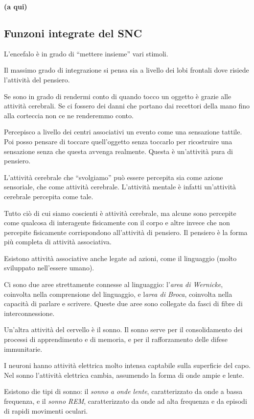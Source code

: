 \documentclass[]{article}
\begin{document}
\textbf{(a qui)}

\subsection{Funzoni integrate del SNC}\label{funzoni-integrate-del-snc}

L'encefalo è in grado di ``mettere insieme'' vari stimoli.

Il massimo grado di integrazione si pensa sia a livello dei lobi
frontali dove risiede l'attività del pensiero.

Se sono in grado di rendermi conto di quando tocco un oggetto è grazie
alle attività cerebrali. Se ci fossero dei danni che portano dai
recettori della mano fino alla corteccia non ce ne renderemmo conto.

Percepisco a livello dei centri associativi un evento come una
sensazione tattile. Poi posso pensare di toccare quell'oggetto senza
toccarlo per ricostruire una sensazione senza che questa avvenga
realmente. Questa è un'attività pura di pensiero.

L'attività cerebrale che ``svolgiamo'' può essere percepita sia come
azione sensoriale, che come attività cerebrale. L'attività mentale è
infatti un'attività cerebrale percepita come tale.

Tutto ciò di cui siamo coscienti è attività cerebrale, ma alcune sono
percepite come qualcosa di interagente fisicamente con il corpo e altre
invece che non percepite fisicamente corrispondono all'attività di
pensiero. Il pensiero è la forma più completa di attività associativa.

Esistono attività associative anche legate ad azioni, come il linguaggio
(molto sviluppato nell'essere umano).

Ci sono due aree strettamente connesse al linguaggio: l'\emph{area di
Wernicke}, coinvolta nella comprensione del linguaggio, e l\emph{area di
Broca}, coinvolta nella capacità di parlare e scrivere. Queste due aree
sono collegate da fasci di fibre di interconnessione.

Un'altra attività del cervello è il sonno. Il sonno serve per il
consolidamento dei processi di apprendimento e di memoria, e per il
rafforzamento delle difese immunitarie.

I neuroni hanno attività elettrica molto intensa captabile sulla
superficie del capo. Nel sonno l'attività elettrica cambia, assumendo la
forma di onde ampie e lente.

Esistono die tipi di sonno: il \emph{sonno a onde lente}, caratterizzato
da onde a bassa frequenza, e il \emph{sonno REM}, caratterizzato da onde
ad alta frequenza e da episodi di rapidi movimenti oculari.
\end{document}

